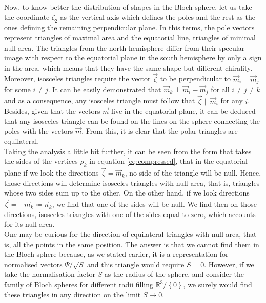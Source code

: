 Now, to know better the distribution of shapes in the Bloch sphere, let us take the coordinate $\zeta_2$ as the vertical axis which defines the poles and the rest as the ones defining the remaining perpendicular plane. In this terms, the pole vectors represent triangles of maximal area and the equatorial line, triangles of minimal null area. The triangles from the north hemisphere differ from their specular image with respect to the equatorial plane in the south hemisphere by only a sign in the area, which means that they have the same shape but different chirality.\\

Moreover, isosceles triangles require the vector $\vec{\zeta}$ to be perpendicular to $\vec{m}_i-\vec{m}_j$ for some $i \neq j$. It can be easily demonstrated that $\vec{m}_k \perp \vec{m}_i-\vec{m}_j$ for all $i \neq j \neq k$ and as a consequence, any isosceles triangle must follow that $\vec{\zeta}\parallel\vec{m}_i$ for any $i$. Besides, given that the vectors $\vec{m}$ live in the equatorial plane, it can be deduced that any isosceles triangle can be found on the lines on the sphere connecting the poles with the vectors $\vec{m}$. From this, it is clear that the polar triangles are equilateral.\\

Taking the analysis a little bit further, it can be seen from the form that takes the sides of the vertices $\rho_k$ in equation \eqref{eq:compressed}, that in the equatorial plane if we look the directions $\vec{\zeta} = \vec{m}_k$, no side of the triangle will be null. Hence, those directions will determine isosceles triangles with null area, that is, triangles whose two sides sum up to the other. On the other hand, if we look directions $\vec{\zeta} = -\vec{m}_k \coloneqq \vec{n}_k$, we find that one of the sides will be null. We find then on those directions, isosceles triangles with one of the sides equal to zero, which accounts for its null area.\\

One may be curious for the direction of equilateral triangles with null area, that is, all the points in the same position.  The answer is that we cannot find them in the Bloch sphere because, as we stated earlier, it is a representation for normalised vectors $\Psi/\sqrt{S}$ and this triangle would require $S=0$. However, if we take the normalisation factor $S$ as the radius of the sphere, and consider the family of Bloch spheres for different radii filling $\mathbb{R}^3/\left\{0\right\}$, we surely would find these triangles in any direction on the limit $S\to 0$.\\

